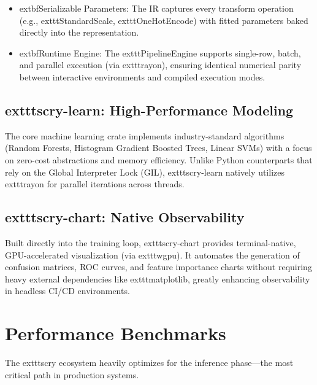 \documentclass[11pt, a4paper]{article}
\begin{document}
\begin{itemize}[leftmargin=*]
    \item 	extbf{Serializable Parameters:} The IR captures every transform operation (e.g., 	exttt{StandardScale}, 	exttt{OneHotEncode}) with fitted parameters baked directly into the representation.
    \item 	extbf{Runtime Engine:} The 	exttt{PipelineEngine} supports single-row, batch, and parallel execution (via 	exttt{rayon}), ensuring identical numerical parity between interactive environments and compiled execution modes.
\end{itemize}

\subsection{	exttt{scry-learn}: High-Performance Modeling}
The core machine learning crate implements industry-standard algorithms (Random Forests, Histogram Gradient Boosted Trees, Linear SVMs) with a focus on zero-cost abstractions and memory efficiency. Unlike Python counterparts that rely on the Global Interpreter Lock (GIL), 	exttt{scry-learn} natively utilizes 	exttt{rayon} for parallel iterations across threads.

\subsection{	exttt{scry-chart}: Native Observability}
Built directly into the training loop, 	exttt{scry-chart} provides terminal-native, GPU-accelerated visualization (via 	exttt{wgpu}). It automates the generation of confusion matrices, ROC curves, and feature importance charts without requiring heavy external dependencies like 	exttt{matplotlib}, greatly enhancing observability in headless CI/CD environments.

\section{Performance Benchmarks}

The 	exttt{scry} ecosystem heavily optimizes for the inference phase—the most critical path in production systems. 
\end{document}

